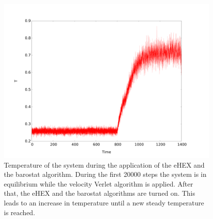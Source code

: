 \documentclass[12pt]{article}
\begin{document}
\begin{figure}[h]
    \begin{center}
        \includegraphics[scale=0.4]{images/baro_temp_long_new.pdf}
        \caption{Temperature of the system during the application of the eHEX and the barostat algorithm. During the first 20000 steps the system is
        in equilibrium while the velocity Verlet algorithm is applied. After that, the eHEX and the barostat algorithms are turned on. This leads to
    an increase in temperature until a new steady temperature is reached.}
        \label{fig:baro1}
    \end{center}
\end{figure}
\end{document}
